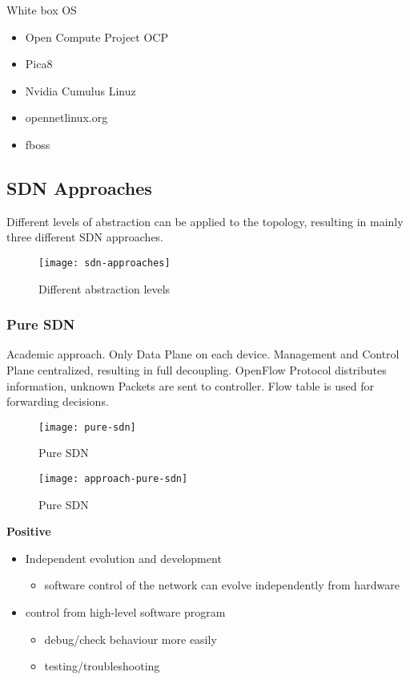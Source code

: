 \noindent
White box OS
\begin{itemize}
	\item Open Compute Project OCP
	\item Pica8
	\item Nvidia Cumulus Linuz
	\item opennetlinux.org
	\item fboss
\end{itemize}



\subsection{SDN Approaches}
Different levels of abstraction can be applied to the topology, resulting in mainly three different SDN approaches. 

\begin{figure}[h]
	\centering
	\texttt{[image: sdn-approaches]}
	\caption{Different abstraction levels}
\end{figure}

\subsubsection{Pure SDN}
Academic approach.
Only Data Plane on each device. 
Management and Control Plane centralized, resulting in full decoupling. 
OpenFlow Protocol distributes information, unknown Packets are sent to controller. 
Flow table is used for forwarding decisions. 

\begin{figure}[h]
	\centering
	\texttt{[image: pure-sdn]}
	\caption{Pure SDN}
\end{figure}
\begin{figure}[h]
	\centering
	\texttt{[image: approach-pure-sdn]}
	\caption{Pure SDN}
\end{figure}

\noindent
\textbf{Positive}
\begin{itemize}
	\item Independent evolution and development 
	\begin{itemize}\item software control of the network can evolve independently from hardware \end{itemize}
	\item control from high-level software program 
	\begin{itemize}\item debug/check behaviour more easily 
	\item testing/troubleshooting\end{itemize} 
\end{itemize}

